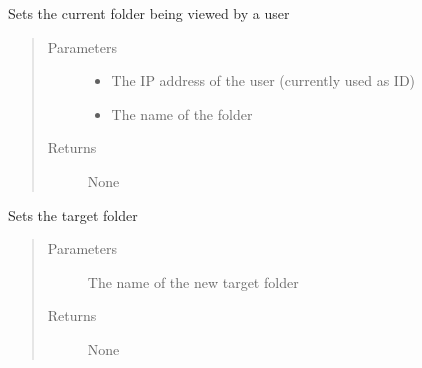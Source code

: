 \documentclass[letterpaper,10pt,english]{sphinxmanual}
\begin{document}
\begin{fulllineitems}
\label{\detokenize{funcs:backend.setCurrent}}
Sets the current folder being viewed by a user
\begin{quote}\begin{description}
\item[{Parameters}] \leavevmode\begin{itemize}
\item {} 
 \textendash{} The IP address of the user (currently used as ID)

\item {} 
 \textendash{} The name of the folder

\end{itemize}

\item[{Returns}] \leavevmode
None

\end{description}\end{quote}

\end{fulllineitems}


\begin{fulllineitems}
\label{\detokenize{funcs:backend.setTarget}}
Sets the target folder
\begin{quote}\begin{description}
\item[{Parameters}] \leavevmode
{} \textendash{} The name of the new target folder

\item[{Returns}] \leavevmode
None

\end{description}\end{quote}

\end{fulllineitems}

\end{document}

